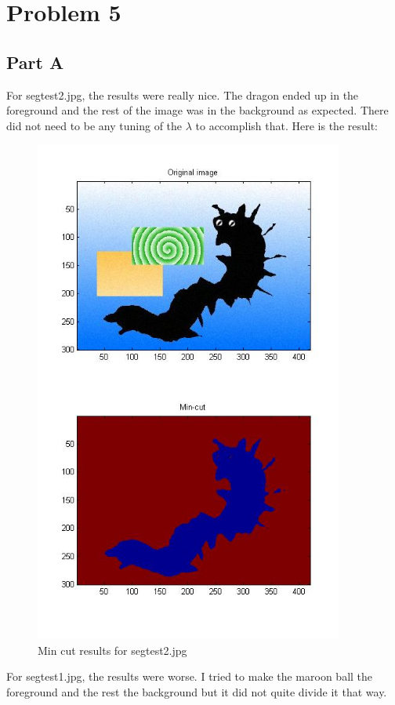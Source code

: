 \documentclass[11pt,psfig]{article}
\begin{document}
\newpage

\section*{Problem 5}

\subsection*{Part A}

For segtest2.jpg, the results were really nice. The dragon ended up in the foreground and the rest of the image was in the background as expected. There did not need to be any tuning of the $\lambda$ to accomplish that. Here is the result:

\begin{figure}[H]
\centering
\includegraphics[width=4in]{prob5plotA.jpg}
\caption{Min cut results for segtest2.jpg}
\end{figure}

For segtest1.jpg, the results were worse. I tried to make the maroon ball the foreground and the rest the background but it did not quite divide it that way.
\end{document}
